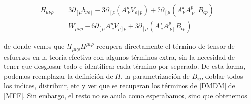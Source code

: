 \documentclass{article}
\numberwithin{equation}{section}
\begin{document}
\begin{equation}
\begin{aligned}
H_{\mu \nu \rho} &= 3 \partial_{\left[\mu\right. } b_{\left.\nu \rho \right]} 
- 3 \partial_{\left[\mu\right.} \left( A^p_{\ \nu} V_{\left. \rho \right] p}\right)
+ 3 \partial_{\left[\mu\right.} \left( A^o_{\ \nu} A^p_{ \ \left. \nu \right]} B_{o p} \right)\\
&= W_{\mu \nu \rho} -6 \partial_{\left[ \mu\right.} A^p_{\ \nu} V_{\left.\rho\right] p} + 3 \partial_{\left[\mu\right.} \left( A^o_{\ \nu} A^p_{ \ \left. \nu \right]} B_{o p} \right)
\end{aligned}
\end{equation}

de donde vemos que $ H_{\mu \nu \rho} H^{\mu \nu \rho} $  recupera directamente el término de tensor de esfuerzos en la teoría efectiva con algunos términos extra, sin la necesidad de tener que desglosar todo e identificar cada término por separado. De esta forma, podemos reemplazar la definición de $ H $, la parametrización de $ B_{i j} $, doblar todos los indices, distribuir, etc y ver que se recuperan los términos de \ref{DMDM} de \ref{MFF}. Sin embargo, el resto no se anula como esperabamos, sino que obtenemos 
\end{document}
